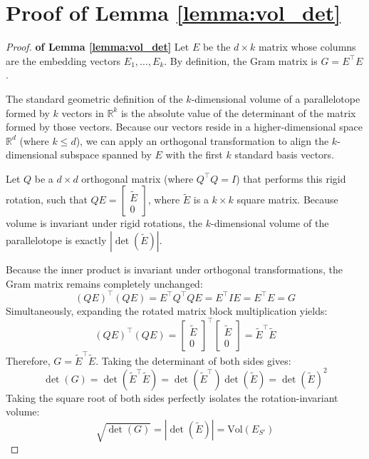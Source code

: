 \documentclass{article}
\newenvironment{proofof}[1]{\begin{proof}\textbf{of {#1}}}{\end{proof}}
\begin{document}
\section{Proof of Lemma \ref{lemma:vol_det}}
\begin{proofof}{Lemma \ref{lemma:vol_det}}
Let $E$ be the $d \times k$ matrix whose columns are the embedding vectors $E_1, \dots, E_k$. By definition, the Gram matrix is $G = E^\top E$. 

The standard geometric definition of the $k$-dimensional volume of a parallelotope formed by $k$ vectors in $\mathbb{R}^k$ is the absolute value of the determinant of the matrix formed by those vectors. Because our vectors reside in a higher-dimensional space $\mathbb{R}^d$ (where $k \le d$), we can apply an orthogonal transformation to align the $k$-dimensional subspace spanned by $E$ with the first $k$ standard basis vectors. 

Let $Q$ be a $d \times d$ orthogonal matrix (where $Q^\top Q = I$) that performs this rigid rotation, such that $Q E = \begin{bmatrix} \tilde{E} \\ 0 \end{bmatrix}$, where $\tilde{E}$ is a $k \times k$ square matrix. Because volume is invariant under rigid rotations, the $k$-dimensional volume of the parallelotope is exactly $|\det(\tilde{E})|$.

Because the inner product is invariant under orthogonal transformations, the Gram matrix remains completely unchanged:
$$ (QE)^\top (QE) = E^\top Q^\top Q E = E^\top I E = E^\top E = G $$
Simultaneously, expanding the rotated matrix block multiplication yields:
$$ (QE)^\top (QE) = \begin{bmatrix} \tilde{E} \\ 0 \end{bmatrix}^\top \begin{bmatrix} \tilde{E} \\ 0 \end{bmatrix} = \tilde{E}^\top \tilde{E} $$
Therefore, $G = \tilde{E}^\top \tilde{E}$. Taking the determinant of both sides gives:
$$ \det(G) = \det(\tilde{E}^\top \tilde{E}) = \det(\tilde{E}^\top)\det(\tilde{E}) = \det(\tilde{E})^2 $$
Taking the square root of both sides perfectly isolates the rotation-invariant volume:
$$ \sqrt{\det(G)} = |\det(\tilde{E})| = \text{Vol}(E_{S'}) $$
\end{proofof}
\end{document}
